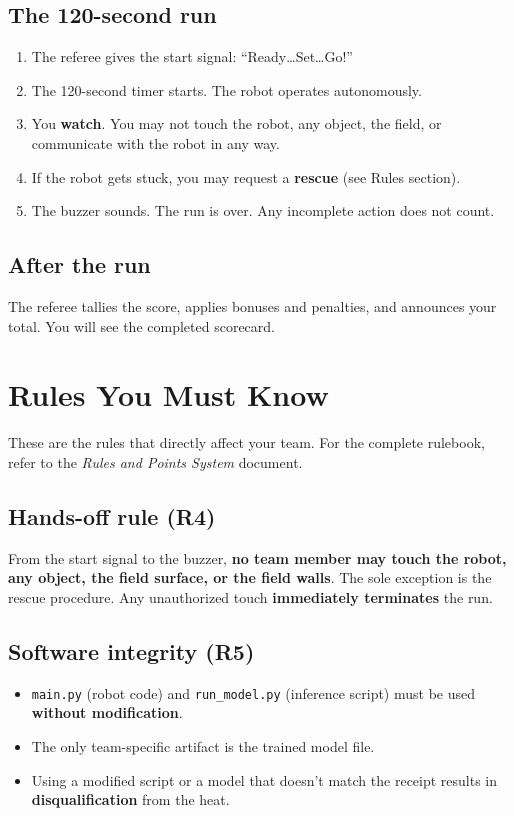 \documentclass[a4]{article}
\begin{document}
\subsection*{The 120-second run}

\begin{enumerate}
    \item The referee gives the start signal: ``Ready\ldots Set\ldots Go!''
    \item The 120-second timer starts. The robot operates autonomously.
    \item You \textbf{watch}. You may not touch the robot, any object, the field, or communicate with the robot in any way.
    \item If the robot gets stuck, you may request a \textbf{rescue} (see Rules section).
    \item The buzzer sounds. The run is over. Any incomplete action does not count.
\end{enumerate}

\subsection*{After the run}

The referee tallies the score, applies bonuses and penalties, and announces your total. You will see the completed scorecard.

\pagebreak
\section*{Rules You Must Know}

These are the rules that directly affect your team. For the complete rulebook, refer to the \textit{Rules and Points System} document.

\subsection*{Hands-off rule (R4)}
From the start signal to the buzzer, \textbf{no team member may touch the robot, any object, the field surface, or the field walls}. The sole exception is the rescue procedure. Any unauthorized touch \textbf{immediately terminates} the run.

\subsection*{Software integrity (R5)}
\begin{itemize}
    \item \texttt{main.py} (robot code) and \texttt{run\_model.py} (inference script) must be used \textbf{without modification}.
    \item The only team-specific artifact is the trained model file.
    \item Using a modified script or a model that doesn't match the receipt results in \textbf{disqualification} from the heat.
\end{itemize}
\end{document}
